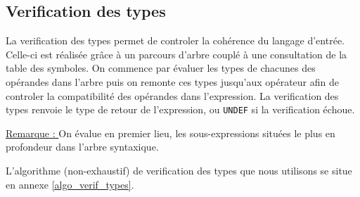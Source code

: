 \newpage
\subsection{Verification des types}

La verification des types permet de controler la cohérence du langage d'entrée. Celle-ci est réalisée grâce à un parcours d'arbre couplé à une consultation de la table des symboles.
On commence par évaluer les types de chacunes des opérandes dans l'arbre puis on remonte ces types jusqu'aux opérateur afin de controler la compatibilité des opérandes dans l'expression. La verification des types renvoie le type de retour de l'expression, ou \verb?UNDEF? si la verification échoue.

\underline{Remarque : } On évalue en premier lieu, les sous-expressions situées le plus en profondeur dans l'arbre syntaxique.

L'algorithme (non-exhaustif) de verification des types que nous utilisons se situe en annexe \ref{algo_verif_types}.
~~\\



